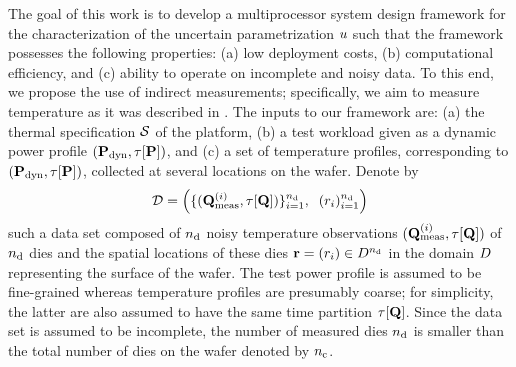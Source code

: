 The goal of this work is to develop a multiprocessor system design framework for the characterization of the uncertain parametrization $u$ such that the framework possesses the following properties: (a) low deployment costs, (b) computational efficiency, and (c) ability to operate on incomplete and noisy data. To this end, we propose the use of indirect measurements; specifically, we aim to measure temperature as it was described in . The inputs to our framework are: (a) the thermal specification $\mathcal{S}$ of the platform, (b) a test workload given as a dynamic power profile $(\mathbf{P}_{\text{dyn}}, \tau[\mathbf{P}])$, and (c) a set of temperature profiles, corresponding to $(\mathbf{P}_{\text{dyn}}, \tau[\mathbf{P}])$, collected at several locations on the wafer. Denote by
\[
  \mathcal{D} = \left(\{ (\mathbf{Q}^{(i)}_{\text{meas}}, \tau[\mathbf{Q}]) \}_{i = 1}^{n_{\text{d}}}, \; \; ( r_i )_{i = 1}^{n_{\text{d}}} \right)
\]
such a data set composed of ${n_{\text{d}}}$ noisy temperature observations $(\mathbf{Q}^{(i)}_{\text{meas}}, \tau[\mathbf{Q}])$ of ${n_{\text{d}}}$ dies and the spatial locations of these dies $\mathbf{r} = (r_i) \in D^{n_{\text{d}}}$ in the domain $D$ representing the surface of the wafer. The test power profile is assumed to be fine-grained whereas temperature profiles are presumably coarse; for simplicity, the latter are also assumed to have the same time partition $\tau[\mathbf{Q}]$. Since the data set is assumed to be incomplete, the number of measured dies ${n_{\text{d}}}$ is smaller than the total number of dies on the wafer denoted by ${n_{\text{c}}}$.
